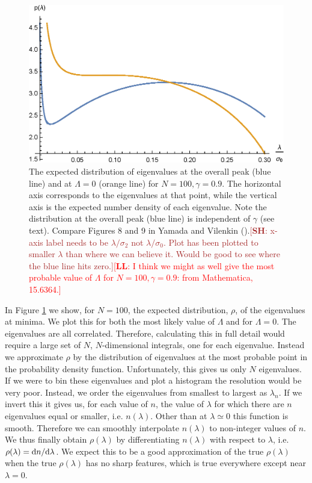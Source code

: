 \documentclass[12pt]{article}
\newcommand{\lfl}[1]{\textcolor{red}{[{\bf LL}: #1]}}
\newcommand{\SH}[1]{\textcolor{brown}{[{\bf SH}: #1]}}
\begin{document}

\begin{figure} 
  \centering
  \includegraphics[width=.9\linewidth]{eigendist.eps}
  \caption{The expected distribution of eigenvalues at the overall peak (blue line) and at $\Lambda=0$ (orange line) for $N=100, \gamma = 0.9$. The horizontal axis corresponds to the eigenvalues at that point, while the vertical axis is the expected number density of each eigenvalue. Note the distribution at the overall peak (blue line) is independent of $\gamma$ (see text). Compare Figures 8 and 9 in Yamada and Vilenkin (\cite{Yamada2018}).\SH{x-axis label needs to be $\lambda/\sigma_2$ not $\lambda/\sigma_0$. Plot has been plotted to smaller $\lambda$ than where we can believe it. Would be good to see where the blue line hits zero.}\lfl{I think we might as well give the most probable value of $\Lambda$ for $N=100, \gamma = 0.9$: from Mathematica, 15.6364.}}
  \label{eigendist}
\end{figure}

In Figure \ref{eigendist} we show, for $N=100$, the expected distribution, $\rho$, of the eigenvalues at minima. We plot this for both the most likely value of $\Lambda$ and for $\Lambda = 0$. The eigenvalues are all correlated. Therefore, calculating this in full detail would require a large set of $N$, $N$-dimensional integrals, one for each eigenvalue. Instead we approximate $\rho$ by the distribution of eigenvalues at the most probable point in the probability density function. Unfortunately, this gives us only $N$ eigenvalues. If we were to bin these eigenvalues and plot a histogram the resolution would be very poor. Instead, we order the eigenvalues from smallest to largest as $\lambda_n$. If we invert this it gives us, for each value of $n$, the value of $\lambda$ for which there are $n$ eigenvalues equal or smaller, i.e. $n(\lambda)$. Other than at $\lambda\simeq 0$ this function is smooth. Therefore we can smoothly interpolate $n(\lambda)$ to non-integer values of $n$. We thus finally obtain $\rho(\lambda)$ by differentiating $n(\lambda)$ with respect to $\lambda$, i.e. $\rho(\lambda) = {\rm d}n/{\rm d}\lambda$. We expect this to be a good approximation of the true $\rho(\lambda)$ when the true $\rho(\lambda)$ has no sharp features, which is true everywhere except near $\lambda=0$.
\end{document}
